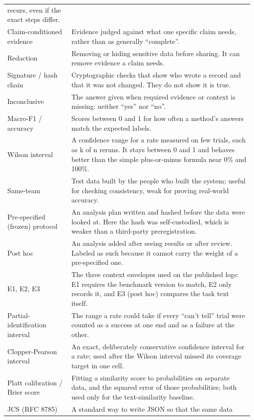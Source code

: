 \documentclass[
  american,
  10pt,
  a4paper,
]{article}
\begin{document}
{\begin{longtable}[]{@{}
  >{\raggedright\arraybackslash}p{}
  >{\raggedright\arraybackslash}p{}@{}}
recurs, even if the exact steps differ. \\
Claim-conditioned evidence & Evidence judged against what one specific
claim needs, rather than as generally ``complete''. \\
Redaction & Removing or hiding sensitive data before sharing. It can
remove evidence a claim needs. \\
Signature / hash chain & Cryptographic checks that show who wrote a
record and that it was not changed. They do not show it is true. \\
Inconclusive & The answer given when required evidence or context is
missing: neither ``yes'' nor ``no''. \\
Macro-F1 / accuracy & Scores between 0 and 1 for how often a method's
answers match the expected labels. \\
Wilson interval & A confidence range for a rate measured on few trials,
such as k of n reruns. It stays between 0 and 1 and behaves better than
the simple plus-or-minus formula near 0\% and 100\%. \\
Same-team & Test data built by the people who built the system; useful
for checking consistency, weak for proving real-world accuracy. \\
Pre-specified (frozen) protocol & An analysis plan written and hashed
before the data were looked at. Here the hash was self-custodied, which
is weaker than a third-party preregistration. \\
Post hoc & An analysis added after seeing results or after review.
Labeled as such because it cannot carry the weight of a pre-specified
one. \\
E1, E2, E3 & The three context envelopes used on the published logs: E1
requires the benchmark version to match, E2 only records it, and E3
(post hoc) compares the task text itself. \\
Partial-identification interval & The range a rate could take if every
``can't tell'' trial were counted as a success at one end and as a
failure at the other. \\
Clopper-Pearson interval & An exact, deliberately conservative
confidence interval for a rate; used after the Wilson interval missed
its coverage target in one cell. \\
Platt calibration / Brier score & Fitting a similarity score to
probabilities on separate data, and the squared error of those
probabilities; both used only for the text-similarity baseline. \\
JCS (RFC 8785) & A standard way to write JSON so that the same data

\end{longtable}}
\end{document}
